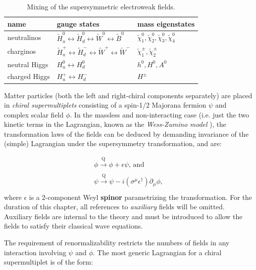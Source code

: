 \begin{table}
\caption{Mixing of the supersymmetric electroweak fields.}
\label{tab:mixing}
\centering
\begin{tabular}{lll}
\hline
\hline
name & gauge states & mass eigenstates \\
\hline
neutralinos & $\widetilde{H}_{u}^{0} \leftrightarrow \widetilde{H}_{d}^{0} \leftrightarrow \widetilde{W}^{0} \leftrightarrow \widetilde{B}^{0}$ & $\tilde{\chi}^{0}_{1}, \tilde{\chi}^{0}_{2}, \tilde{\chi}^{0}_{3}, \tilde{\chi}^{0}_{4}$ \\
charginos & $\widetilde{H}_{u}^{+} \leftrightarrow \widetilde{H}_{d}^{-} \leftrightarrow \widetilde{W}^{+} \leftrightarrow \widetilde{W}^{-}$ & $\tilde{\chi}^{\pm}_{1}, \tilde{\chi}^{\pm}_{2}$ \\
neutral Higgs & ${H}_{u}^{0} \leftrightarrow {H}_{d}^{0}$ & $h^{0}, H^{0}, A^{0}$\\
charged Higgs & ${H}_{u}^{+} \leftrightarrow {H}_{d}^{-}$ & $H^{\pm}$\\
\hline
\hline
\end{tabular}
\end{table}

Matter particles (both the left and right-chiral components separately) are placed in \textit{chiral supermultiplets} consisting of a spin-1/2 Majorana fermion $\psi$ and complex scalar field $\phi$. In the massless and non-interacting case (i.e. just the two kinetic terms in the Lagrangian, known as the \textit{Wess-Zumino model} \cite{wesszumino}), the transformation laws of the fields can be deduced by demanding invariance of the (simple) Lagrangian under the supersymmetry transformation, and are:
 
\begin{equation}
\begin{array}{l}
\phi \xrightarrow[]{\text{Q}} \phi + \epsilon \psi, \,\textrm{and} \\
\psi \xrightarrow[]{\text{Q}} \psi - i ( \sigma^{\mu} \epsilon^{\dagger} ) \partial_{\mu} \phi, \\
\end{array}
\end{equation}
where $\epsilon$ is a 2-component Weyl \textbf{spinor} parametrizing the transformation. For the duration of this chapter, all references to \textit{auxiliary} fields will be omitted. Auxiliary fields are internal to the theory and must be introduced to allow the fields to satisfy their classical wave equations.

The requirement of renormalizability restricts the numbers of fields in any interaction involving $\psi$ and $\phi$. The most generic Lagrangian for a chiral supermultiplet is of the form:

